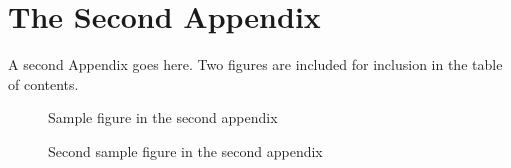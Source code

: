 \documentclass[dvips,11pt,twoside]{report}
\begin{document}
\chapter{The Second Appendix}

A second Appendix goes here.  Two figures are included for inclusion in the
table of contents.

\begin{figure} \caption{Sample figure in the second appendix} \begin{center}
\end{center} \end{figure}

\begin{figure} \caption{Second sample figure in the second appendix} 
\begin{center}
\end{center} \end{figure}
\end{document}

